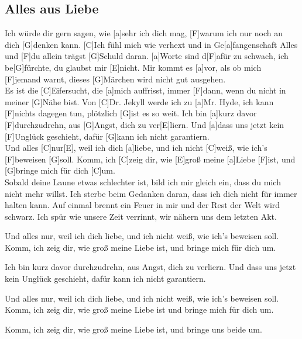 \documentclass[10pt,a5paper,twoside]{scrbook}
\begin{document}
\newpage  
  	

\subsection{Alles aus Liebe}
\begin{guitar}
[C]Ich würde dir gern sagen, wie [a]sehr ich dich mag, 
[F]warum ich nur noch an dich [G]denken kann.
[C]Ich fühl mich wie verhext und in Ge[a]fangenschaft
Alles und [F]du allein trägst [G]Schuld daran.
[a]Worte sind d[F]afür zu schwach,
ich be[G]fürchte, du glaubst mir [E]nicht.
Mir kommt es [a]vor, als ob mich [F]jemand warnt,
dieses [G]Märchen wird nicht gut ausgehen.
\\
Es ist die [C]Eifersucht, die [a]mich auffrisst,
immer [F]dann, wenn du nicht in meiner [G]Nähe bist.
Von [C]Dr. Jekyll werde ich zu [a]Mr. Hyde,
ich kann [F]nichts dagegen tun, plötzlich [G]ist es so weit.
Ich bin [a]kurz davor [F]durchzudrehn, aus [G]Angst, dich zu ver[E]liern.
Und [a]dass uns jetzt kein [F]Unglück geschieht, dafür [G]kann ich nicht garantiern.
\\
Und alles [C]nur[E], weil ich dich [a]liebe, 
und ich nicht [C]weiß, wie ich's [F]beweisen [G]soll.
Komm, ich [C]zeig dir, wie [E]groß meine [a]Liebe [F]ist, 
und [G]bringe mich für dich [C]um.
\\
Sobald deine Laune etwas schlechter ist,
bild ich mir gleich ein, dass du mich nicht mehr willst.
Ich sterbe beim Gedanken daran,
dass ich dich nicht für immer halten kann.
Auf einmal brennt ein Feuer in mir
und der Rest der Welt wird schwarz.
Ich spür wie unsere Zeit verrinnt,
wir nähern uns dem letzten Akt.

Und alles nur, weil ich dich liebe,
und ich nicht weiß, wie ich's beweisen soll.
Komm, ich zeig dir, wie groß meine Liebe ist,
und bringe mich für dich um.

Ich bin kurz davor durchzudrehn,
aus Angst, dich zu verliern.
Und dass uns jetzt kein Unglück geschieht,
dafür kann ich nicht garantiern.

Und alles nur, weil ich dich liebe,
und ich nicht weiß, wie ich's beweisen soll.
Komm, ich zeig dir, wie groß meine Liebe ist
und bringe mich für dich um.

Komm, ich zeig dir, wie groß meine Liebe ist,
und bringe uns beide um.
\end{guitar}

  	
\newpage  
 	
\end{document}
